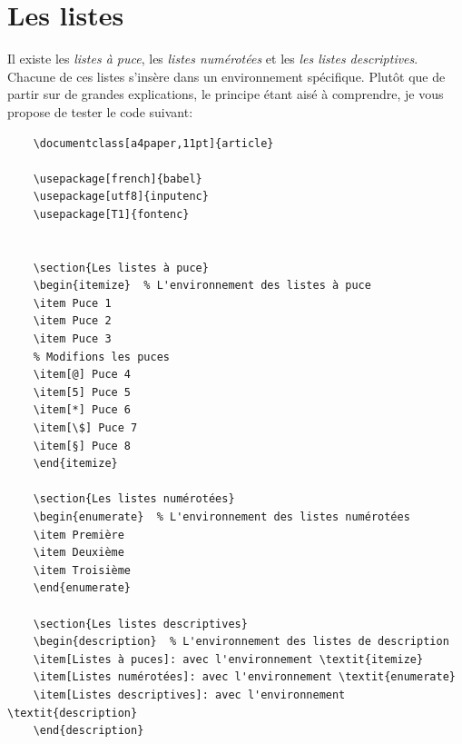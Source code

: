 \section{Les listes}
Il existe les \textit{listes à puce}, les \textit{listes numérotées} et les \textit{les listes descriptives}. Chacune de ces listes s'insère dans un environnement spécifique. Plutôt que de partir sur de grandes explications, le principe étant aisé à comprendre, je vous propose de tester le code suivant:
\begin{verbatim}
    \documentclass[a4paper,11pt]{article}

    \usepackage[french]{babel}
    \usepackage[utf8]{inputenc}
    \usepackage[T1]{fontenc}

    
    \section{Les listes à puce}
    \begin{itemize}  % L'environnement des listes à puce
    \item Puce 1
    \item Puce 2
    \item Puce 3
    % Modifions les puces
    \item[@] Puce 4
    \item[5] Puce 5
    \item[*] Puce 6
    \item[\$] Puce 7
    \item[§] Puce 8
    \end{itemize}

    \section{Les listes numérotées}
    \begin{enumerate}  % L'environnement des listes numérotées
    \item Première
    \item Deuxième
    \item Troisième
    \end{enumerate}

    \section{Les listes descriptives}
    \begin{description}  % L'environnement des listes de description
    \item[Listes à puces]: avec l'environnement \textit{itemize}
    \item[Listes numérotées]: avec l'environnement \textit{enumerate}
    \item[Listes descriptives]: avec l'environnement \textit{description} 
    \end{description}
    
\end{verbatim}
\medskip

